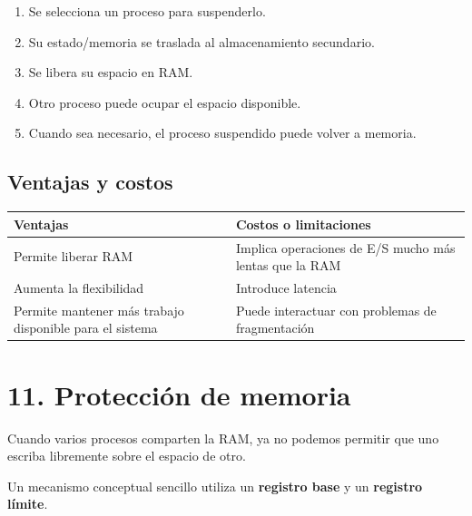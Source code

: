 \documentclass[
  spanish,
  letterpaper,
]{scrbook}
\newcounter{none} %
\providecommand{\tightlist}{%
  \setlength{\itemsep}{0pt}\setlength{\parskip}{0pt}}
\begin{document}
\begin{enumerate}
\def\labelenumi{\arabic{enumi}.}
\tightlist
\item
  Se selecciona un proceso para suspenderlo.
\item
  Su estado/memoria se traslada al almacenamiento secundario.
\item
  Se libera su espacio en RAM.
\item
  Otro proceso puede ocupar el espacio disponible.
\item
  Cuando sea necesario, el proceso suspendido puede volver a memoria.
\end{enumerate}

\subsection{Ventajas y costos}\label{ventajas-y-costos}

{\def\LTcaptype{none} %
\begin{longtable}[]{@{}
  >{\raggedright\arraybackslash}p{}
  >{\raggedright\arraybackslash}p{}@{}}
\toprule\noalign{}
\begin{minipage}[b]{\linewidth}\raggedright
Ventajas
\end{minipage} & \begin{minipage}[b]{\linewidth}\raggedright
Costos o limitaciones
\end{minipage} \\
\midrule\noalign{}
\endhead
\bottomrule\noalign{}
\endlastfoot
Permite liberar RAM & Implica operaciones de E/S mucho más lentas que la
RAM \\
Aumenta la flexibilidad & Introduce latencia \\
Permite mantener más trabajo disponible para el sistema & Puede
interactuar con problemas de fragmentación \\
\end{longtable}
}

\section{11. Protección de memoria}\label{protecciuxf3n-de-memoria-1}

Cuando varios procesos comparten la RAM, ya no podemos permitir que uno
escriba libremente sobre el espacio de otro.

Un mecanismo conceptual sencillo utiliza un \textbf{registro base} y un
\textbf{registro límite}.
\end{document}
